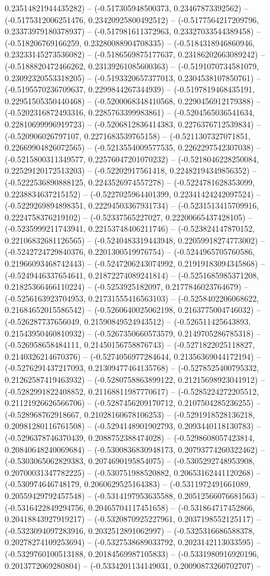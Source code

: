 0.23514821944435282) -- (-0.517305948500373, 0.23467873392562) -- (-0.5175312006251476, 0.23420925800492512) -- (-0.5177564217209796, 0.23373979180378937) -- (-0.517981611372963, 0.23327033544389458) -- (-0.518206769166259, 0.23280088904708335) -- (-0.5184318946860946, 0.23233145273536082) -- (-0.5186569875177637, 0.23186202663089242) -- (-0.5188820472466262, 0.23139261085600363) -- (-0.5191070734581079, 0.23092320553318205) -- (-0.5193320657377013, 0.2304538107850761) -- (-0.5195570236709637, 0.2299844267344939) -- (-0.5197819468435191, 0.22951505350440468) -- (-0.5200068348410568, 0.2290456912179388) -- (-0.5202316872493316, 0.2285763399983861) -- (-0.5204565036541634, 0.22810699996919723) -- (-0.5206812836414383, 0.2276376712539834) -- (-0.520906026797107, 0.2271683539765158) -- (-0.5211307327071851, 0.22669904826072565) -- (-0.5213554009577535, 0.2262297542307038) -- (-0.5215800311349577, 0.22576047201070232) -- (-0.5218046228250084, 0.22529120172513203) -- (-0.52202917561418, 0.22482194349856352) -- (-0.5222536890888125, 0.2243526974557278) -- (-0.5224781628353099, 0.2238834637215152) -- (-0.5227025964401399, 0.22341424242097524) -- (-0.5229269894898351, 0.22294503367931734) -- (-0.5231513415709916, 0.2224758376219102) -- (-0.52337565227027, 0.22200665437428105) -- (-0.5235999211743941, 0.22153748406211746) -- (-0.523824147870152, 0.22106832681126565) -- (-0.5240483319443948, 0.22059918274773002) -- (-0.5242724729840376, 0.2201300519976754) -- (-0.5244965705760586, 0.21966093468742443) -- (-0.5247206243074992, 0.21919183094345868) -- (-0.5249446337654641, 0.21872274089241814) -- (-0.5251685985371208, 0.21825366466110224) -- (-0.5253925182097, 0.2177846023764679) -- (-0.5256163923704953, 0.21731555416563103) -- (-0.5258402206068622, 0.21684652015586542) -- (-0.5260640025062198, 0.2163775004746032) -- (-0.526287737656049, 0.21590849524943512) -- (-0.526511425643893, 0.21543950460810932) -- (-0.5267350660573579, 0.2149705286785318) -- (-0.526958658484111, 0.21450156758876743) -- (-0.5271822025118827, 0.2140326214670376) -- (-0.5274056977284644, 0.21356369044172194) -- (-0.5276291437217093, 0.21309477464135768) -- (-0.5278525400795332, 0.21262587419463932) -- (-0.5280758863899122, 0.21215698923041912) -- (-0.5282991822408852, 0.21168811987770617) -- (-0.5285224272205512, 0.21121926626566706) -- (-0.5287456209170712, 0.2107504285236255) -- (-0.528968762918667, 0.21028160678106253) -- (-0.5291918528136218, 0.20981280116761508) -- (-0.5294148901902793, 0.2093440118130783) -- (-0.5296378746370439, 0.2088752388474028) -- (-0.5298608057423814, 0.20840648240069684) -- (-0.5300836830948173, 0.20793774260322462) -- (-0.5303065062829383, 0.2074690195854075) -- (-0.5305292748953908, 0.20700031347782225) -- (-0.530751988520882, 0.20653162441120268) -- (-0.530974646748179, 0.2060629525164383) -- (-0.5311972491661089, 0.20559429792457548) -- (-0.5314197953635588, 0.20512566076681563) -- (-0.5316422849294756, 0.20465704117451658) -- (-0.531864717452866, 0.20418843927919217) -- (-0.5320870925227961, 0.2037198552125117) -- (-0.5323094097283916, 0.2032512891062997) -- (-0.5325316686588378, 0.20278274109253694) -- (-0.5327538689033792, 0.2023142113033595) -- (-0.5329760100513188, 0.20184569987105833) -- (-0.5331980916920196, 0.2013772069280804) -- (-0.5334201134149031, 0.20090873260702707) -- 